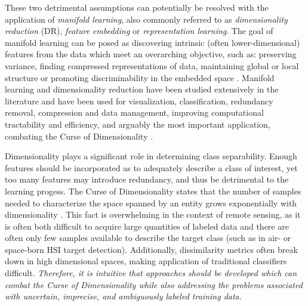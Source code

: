 These two detrimental assumptions can potentially be resolved with the application of \textit{manifold learning}, also commonly referred to as \textit{dimensionality reduction} (DR), \textit{feature embedding} or \textit{representation learning}.  The goal of manifold learning can be posed as discovering intrinsic (often lower-dimensional) features from the data which meet an overarching objective, such as: preserving variance, finding compressed representations of data, maintaining global or local structure or promoting discriminability in the embedded space \cite{VanDerMaaten2009DRReview,Bengio2014RepLearningReview, Geng2005SupNonlinearDimRed}.  Manifold learning and dimensionality reduction have been studied extensively in the literature and have been used for visualization, classification, redundancy removal, compression and data management, improving computational tractability and efficiency, and arguably the most important application, combating the Curse of Dimensionality \cite{Bishop1998GTM,Nickel2017PoincareEmbeddings,Talmon2015ManifoldLearningInDynamicalSystems,Tenenbaum2000Isomap, Geng2005SupNonlinearDimRed, Palomo2017GHNG, Kohonen1990SOM,Kegl2008PrincipalManifoldsTextbook,Bengio2014RepLearningReview}.


Dimensionality plays a significant role in determining class separability.  Enough features should be incorporated as to adequately describe a class of interest, yet too many features may introduce redundancy, and thus be detrimental to the learning progess. The Curse of Dimensionality  states that the number of samples needed to characterize the space spanned by an entity grows exponentially with dimensionality \cite{Murphy2012, Theodoris2008KPCA}.  This fact is overwhelming in the context of remote sensing, as it is often both difficult to acquire large quantities of labeled data and there are often only few samples available to describe the target class (such as in air- or space-born HSI target detection). Additionally, dissimilarity metrics often break down in high dimensional spaces, making application of traditional classifiers difficult.  \textit{Therefore,  it is intuitive that approaches should be developed which can combat the Curse  of Dimensionality while also addressing the problems associated with uncertain, imprecise, and ambiguously labeled training data.}

